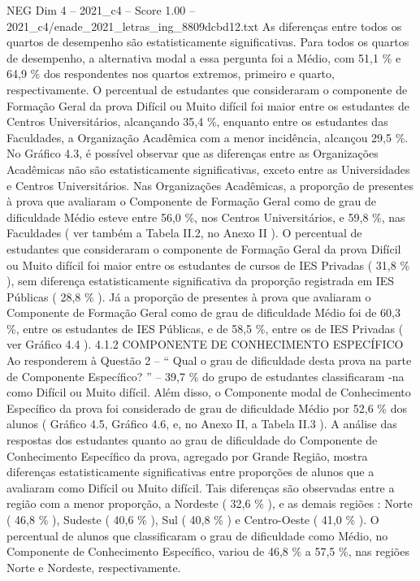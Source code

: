 \begin{textsample}{NEG Dim 4 – 2021\_c4 – Score 1.00 – 2021\_c4/enade\_2021\_letras\_ing\_8809dcbd12.txt}
As diferenças entre todos os quartos de desempenho são estatisticamente significativas.
Para todos os quartos de desempenho, a alternativa modal a essa pergunta foi a Médio, com 51,1 \% e 64,9 \% dos respondentes nos quartos extremos, primeiro e quarto, respectivamente.
O percentual de estudantes que consideraram o componente de Formação Geral da prova Difícil ou Muito difícil foi maior entre os estudantes de Centros Universitários, alcançando 35,4 \%, enquanto entre os estudantes das Faculdades, a Organização Acadêmica com a menor incidência, alcançou 29,5 \%.
No Gráfico 4.3, é possível observar que as diferenças entre as Organizações Acadêmicas não são estatisticamente significativas, exceto entre as Universidades e Centros Universitários.
Nas Organizações Acadêmicas, a proporção de presentes à prova que avaliaram o Componente de Formação Geral como de grau de dificuldade Médio esteve entre 56,0 \%, nos Centros Universitários, e 59,8 \%, nas Faculdades ( ver também a Tabela II.2, no Anexo II ).
O percentual de estudantes que consideraram o componente de Formação Geral da prova Difícil ou Muito difícil foi maior entre os estudantes de cursos de IES Privadas ( 31,8 \% ), sem diferença estatisticamente significativa da proporção registrada em IES Públicas ( 28,8 \% ).
Já a proporção de presentes à prova que avaliaram o Componente de Formação Geral como de grau de dificuldade Médio foi de 60,3 \%, entre os estudantes de IES Públicas, e de 58,5 \%, entre os de IES Privadas ( ver Gráfico 4.4 ). 4.1.2 COMPONENTE DE CONHECIMENTO ESPECÍFICO Ao responderem à Questão 2 – “ Qual o grau de dificuldade desta prova na parte de Componente Específico? ” – 39,7 \% do grupo de estudantes classificaram -na como Difícil ou Muito difícil.
Além disso, o Componente modal de Conhecimento Específico da prova foi considerado de grau de dificuldade Médio por 52,6 \% dos alunos ( Gráfico 4.5, Gráfico 4.6, e, no Anexo II, a Tabela II.3 ).
A análise das respostas dos estudantes quanto ao grau de dificuldade do Componente de Conhecimento Específico da prova, agregado por Grande Região, mostra diferenças estatisticamente significativas entre proporções de alunos que a avaliaram como Difícil ou Muito difícil.
Tais diferenças são observadas entre a região com a menor proporção, a Nordeste ( 32,6 \% ), e as demais regiões : Norte ( 46,8 \% ), Sudeste ( 40,6 \% ), Sul ( 40,8 \% ) e Centro-Oeste ( 41,0 \% ).
O percentual de alunos que classificaram o grau de dificuldade como Médio, no Componente de Conhecimento Específico, variou de 46,8 \% a 57,5 \%, nas regiões Norte e Nordeste, respectivamente.

\end{textsample}
